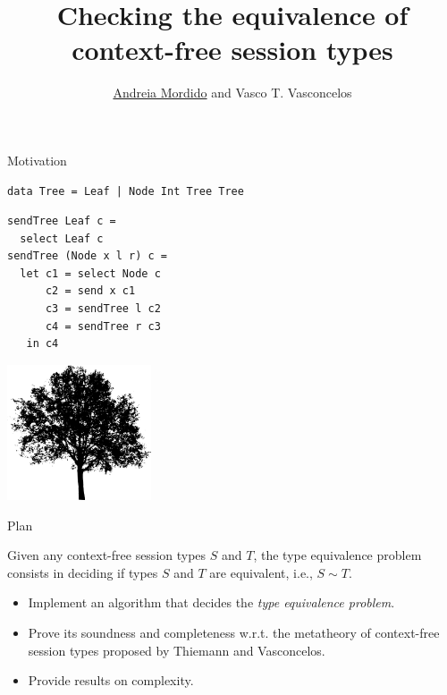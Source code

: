 \documentclass[10pt]{beamer}
\title[Checking the equivalence of context-free session types]{Checking the equivalence of context-free session types}
\date{
\vspace*{1cm}
\begin{center}
	January 2019
\end{center}}
\author[A.Mordido, V.Vasconcelos]{\underline{Andreia Mordido} and Vasco T. Vasconcelos}
\institute[LASIGE, Faculdade de Ci\^encias, ULisboa]{LASIGE, Faculdade de Ci\^encias, Universidade de Lisboa \\\\
}
\begin{document}
\lstset{language=Haskell}

\maketitle

\begin{frame}[fragile]{Motivation}
\vspace*{5mm}

\begin{lstlisting}
data Tree = Leaf | Node Int Tree Tree
\end{lstlisting}

\begin{lstlisting}
sendTree Leaf c =
  select Leaf c
sendTree (Node x l r) c =
  let c1 = select Node c
      c2 = send x c1
      c3 = sendTree l c2
      c4 = sendTree r c3
   in c4
\end{lstlisting}
  
\vspace*{-1.8cm}
\hfill \includegraphics[height=4cm]{img/tree}
\end{frame}


\begin{frame}{Plan}

  	\begin{definition} 
    	\smallskip 
    	Given any context-free session types $S$ and $T$, the type equivalence problem consists in deciding if types $S$ and $T$ are equivalent, i.e., $S\sim T$.
  	\end{definition}

  	\begin{itemize}
    	\item Implement an algorithm that decides the \emph{type equivalence problem}.
    	\item Prove its soundness and completeness w.r.t. the metatheory of context-free session types proposed by Thiemann and Vasconcelos.
    	\item Provide results on complexity.
  	\end{itemize}
\end{frame}
\end{document}

